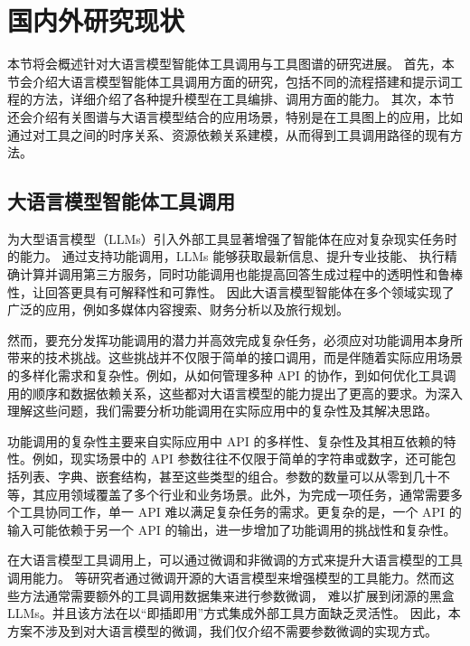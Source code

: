\section{国内外研究现状}

本节将会概述针对大语言模型智能体工具调用与工具图谱的研究进展。
首先，本节会介绍大语言模型智能体工具调用方面的研究，包括不同的流程搭建和提示词工程的方法，详细介绍了各种提升模型在工具编排、调用方面的能力。
其次，本节还会介绍有关图谱与大语言模型结合的应用场景，特别是在工具图上的应用，比如通过对工具之间的时序关系、资源依赖关系建模，从而得到工具调用路径的现有方法。

\subsection{大语言模型智能体工具调用}

为大型语言模型（LLMs）引入外部工具显著增强了智能体在应对复杂现实任务时的能力\cite{huang2024planning, Qin2023, qu2024tool}。
通过支持功能调用，LLMs 能够获取最新信息、提升专业技能、
执行精确计算并调用第三方服务，同时功能调用也能提高回答生成过程中的透明性和鲁棒性，让回答更具有可解释性和可靠性。
因此大语言模型智能体在多个领域实现了广泛的应用，例如多媒体内容搜索\cite{Song2023}、财务分析\cite{theuma2024equipping}以及旅行规划\cite{hao2024large}。

然而，要充分发挥功能调用的潜力并高效完成复杂任务，必须应对功能调用本身所带来的技术挑战。这些挑战并不仅限于简单的接口调用，而是伴随着实际应用场景的多样化需求和复杂性。例如，从如何管理多种 API 的协作，到如何优化工具调用的顺序和数据依赖关系，这些都对大语言模型的能力提出了更高的要求\cite{huang2024planning, Qin2023}。为深入理解这些问题，我们需要分析功能调用在实际应用中的复杂性及其解决思路。

功能调用的复杂性主要来自实际应用中 API 的多样性、复杂性及其相互依赖的特性\cite{Qin2023}。例如，现实场景中的 API 参数往往不仅限于简单的字符串或数字，还可能包括列表、字典、嵌套结构，甚至这些类型的组合。参数的数量可以从零到几十不等，其应用领域覆盖了多个行业和业务场景\cite{ye2024tooleyes}。此外，为完成一项任务，通常需要多个工具协同工作，单一 API 难以满足复杂任务的需求\cite{huang2024planning}。更复杂的是，一个 API 的输入可能依赖于另一个 API 的输出\cite{Qin2023}，进一步增加了功能调用的挑战性和复杂性。

在大语言模型工具调用上，可以通过微调和非微调的方式来提升大语言模型的工具调用能力。
\cite{Qin2023, schick2024toolformer, hao2024toolkengpt, parisi2022talm}等研究者通过微调开源的大语言模型来增强模型的工具能力。然而这些方法通常需要额外的工具调用数据集来进行参数微调，
难以扩展到闭源的黑盒LLMs。并且该方法在以“即插即用”方式集成外部工具方面缺乏灵活性。
因此，本方案不涉及到对大语言模型的微调，我们仅介绍不需要参数微调的实现方式。

